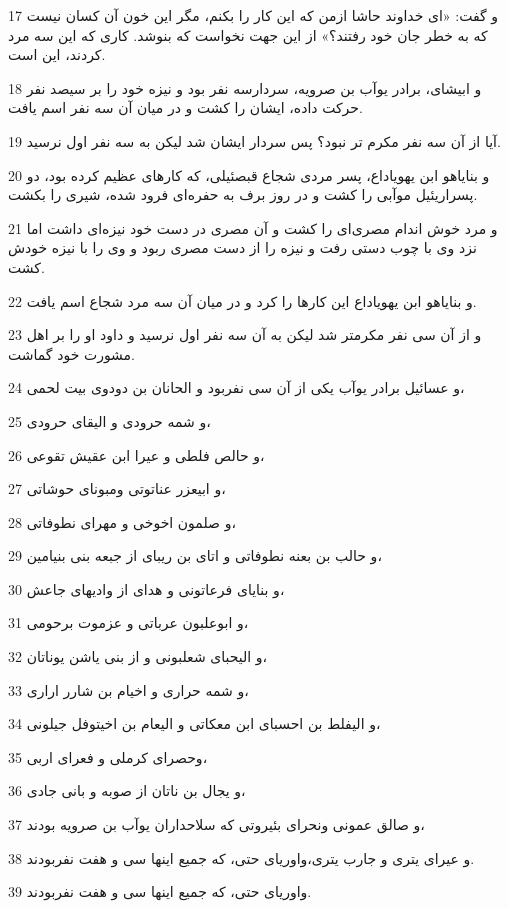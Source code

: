 \par 17 و گفت: «ای خداوند حاشا ازمن که این کار را بکنم، مگر این خون آن کسان نیست که به خطر جان خود رفتند؟» از این جهت نخواست که بنوشد. کاری که این سه مرد کردند، این است.
\par 18 و ابیشای، برادر یوآب بن صرویه، سردارسه نفر بود و نیزه خود را بر سیصد نفر حرکت داده، ایشان را کشت و در میان آن سه نفر اسم یافت.
\par 19 آیا از آن سه نفر مکرم تر نبود؟ پس سردار ایشان شد لیکن به سه نفر اول نرسید.
\par 20 و بنایاهو ابن یهویاداع، پسر مردی شجاع قبصئیلی، که کارهای عظیم کرده بود، دو پسراریئیل موآبی را کشت و در روز برف به حفره‌ای فرود شده، شیری را بکشت.
\par 21 و مرد خوش اندام مصری‌ای را کشت و آن مصری در دست خود نیزه‌ای داشت اما نزد وی با چوب دستی رفت و نیزه را از دست مصری ربود و وی را با نیزه خودش کشت.
\par 22 و بنایاهو ابن یهویاداع این کارها را کرد و در میان آن سه مرد شجاع اسم یافت.
\par 23 و از آن سی نفر مکرمتر شد لیکن به آن سه نفر اول نرسید و داود او را بر اهل مشورت خود گماشت.
\par 24 و عسائیل برادر یوآب یکی از آن سی نفربود و الحانان بن دودوی بیت لحمی،
\par 25 و شمه حرودی و الیقای حرودی،
\par 26 و حالص فلطی و عیرا ابن عقیش تقوعی،
\par 27 و ابیعزر عناتوتی ومبونای حوشاتی،
\par 28 و صلمون اخوخی و مهرای نطوفاتی،
\par 29 و حالب بن بعنه نطوفاتی و اتای بن ریبای از جبعه بنی بنیامین،
\par 30 و بنایای فرعاتونی و هدای از وادیهای جاعش،
\par 31 و ابوعلبون عرباتی و عزموت برحومی،
\par 32 و الیحبای شعلبونی و از بنی یاشن یوناتان،
\par 33 و شمه حراری و اخیام بن شارر اراری،
\par 34 و الیفلط بن احسبای ابن معکاتی و الیعام بن اخیتوفل جیلونی،
\par 35 وحصرای کرملی و فعرای اربی،
\par 36 و یجال بن ناتان از صوبه و بانی جادی،
\par 37 و صالق عمونی ونحرای بئیروتی که سلاحداران یوآب بن صرویه بودند،
\par 38 و عیرای یتری و جارب یتری،واوریای حتی، که جمیع اینها سی و هفت نفربودند.
\par 39 واوریای حتی، که جمیع اینها سی و هفت نفربودند.
 
